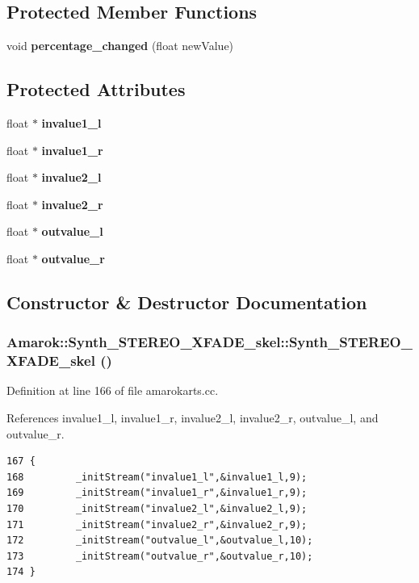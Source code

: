 \subsection*{Protected Member Functions}
\begin{CompactItemize}
\item 
void {\bf percentage\_\-changed} (float new\-Value)
\end{CompactItemize}
\subsection*{Protected Attributes}
\begin{CompactItemize}
\item 
float $\ast$ {\bf invalue1\_\-l}
\item 
float $\ast$ {\bf invalue1\_\-r}
\item 
float $\ast$ {\bf invalue2\_\-l}
\item 
float $\ast$ {\bf invalue2\_\-r}
\item 
float $\ast$ {\bf outvalue\_\-l}
\item 
float $\ast$ {\bf outvalue\_\-r}
\end{CompactItemize}


\subsection{Constructor \& Destructor Documentation}
\subsubsection{\setlength{\rightskip}{0pt plus 5cm}Amarok::Synth\_\-STEREO\_\-XFADE\_\-skel::Synth\_\-STEREO\_\-XFADE\_\-skel ()}\label{classAmarok_1_1Synth__STEREO__XFADE__skel_Amarok_1_1Synth__STEREO__XFADE__skela0}




Definition at line 166 of file amarokarts.cc.

References invalue1\_\-l, invalue1\_\-r, invalue2\_\-l, invalue2\_\-r, outvalue\_\-l, and outvalue\_\-r.



\footnotesize\begin{verbatim}167 {
168         _initStream("invalue1_l",&invalue1_l,9);
169         _initStream("invalue1_r",&invalue1_r,9);
170         _initStream("invalue2_l",&invalue2_l,9);
171         _initStream("invalue2_r",&invalue2_r,9);
172         _initStream("outvalue_l",&outvalue_l,10);
173         _initStream("outvalue_r",&outvalue_r,10);
174 }
\end{verbatim}\normalsize 



